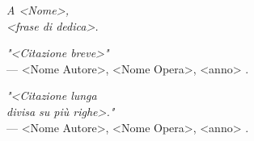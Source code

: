 \thispagestyle{empty}

\begin{flushright}

\vfill 

\textit{A <Nome>, \\
<frase di dedica>.}

\vfill

\emph{"<Citazione breve>"} \\ 
--- <Nome Autore>, <Nome Opera>, <anno> \cite{author2023book}.

\vfill 
\vfill
\vfill
\vfill

\end{flushright}

\newpage
\thispagestyle{empty}

\begin{flushright}

\emph{"<Citazione lunga \\
divisa su più righe>."} \\
--- <Nome Autore>, <Nome Opera>, <anno> \cite{author2023inbook}.

\end{flushright}